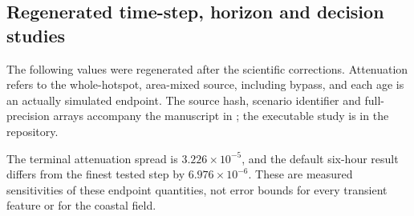 \subsection{Regenerated time-step, horizon and decision studies}
\label{sec:timescale_revision}

The following values were regenerated after the scientific corrections.
Attenuation refers to the whole-hotspot, area-mixed source, including bypass,
and each age is an actually simulated endpoint. The source hash, scenario
identifier and full-precision arrays accompany the manuscript in
; the executable study is
 in the repository.


\begin{table}[htbp]\centering\small
\caption{Regenerated two-year temporal refinement. Source attenuation and the whole-hotspot water input have a different control volume from active column inventory.}\label{tab:revised-refinement}
\end{table}


The terminal attenuation spread is $3.226\times10^{-5}$, and the default six-hour result differs from the finest tested step by $6.976\times10^{-6}$. These are measured sensitivities of these endpoint quantities, not error bounds for every transient feature or for the coastal field.


